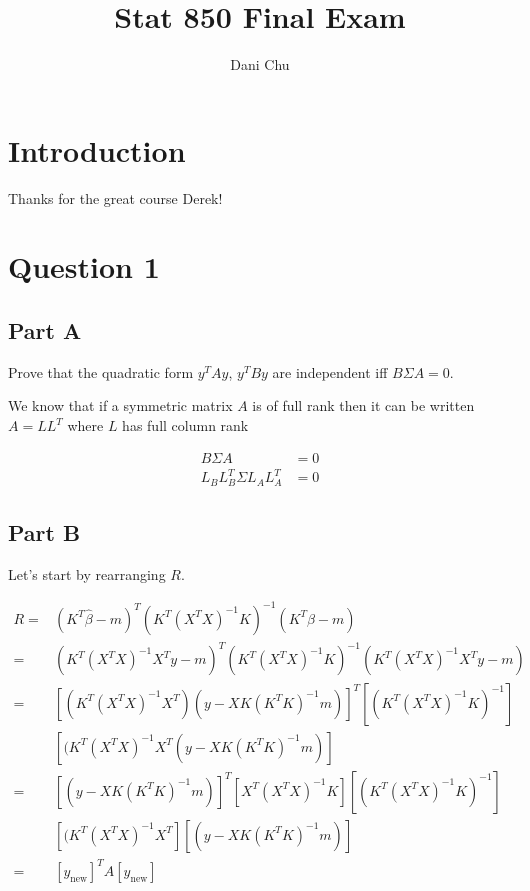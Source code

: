 \documentclass[]{book}
\title{Stat 850 Final Exam}
\author{Dani Chu}
\date{}
\begin{document}
\maketitle

{
\setcounter{tocdepth}{1}
\tableofcontents
}
\hypertarget{introduction}{%
\chapter{Introduction}\label{introduction}}

Thanks for the great course Derek!

\hypertarget{question-1}{%
\chapter{Question 1}\label{question-1}}

\hypertarget{part-a}{%
\section{Part A}\label{part-a}}

Prove that the quadratic form \(y^{T} A y\), \(y^{T} B y\) are independent iff \(B \Sigma A = 0\).

We know that if a symmetric matrix \(A\) is of full rank then it can be written \(A = LL^T\) where \(L\) has full column rank

\begin{align}
  B \Sigma A &= 0 \\
  L_{B}L_{B}^T \Sigma L_{A}L_{A}^T & = 0
\end{align}

\hypertarget{part-b}{%
\section{Part B}\label{part-b}}

Let's start by rearranging \(R\).

\begin{align}
  R =& (K^T \hat{\beta} -m )^T (K^T (X^T X)^{-1} K)^{-1} (K^T \hat{\beta} - m) \\
    =& (K^T (X^T X)^{-1} X^T y - m )^T (K^T (X^T X)^{-1} K)^{-1} (K^T (X^T X)^{-1} X^T y - m) \\
    =& [ (K^T (X^T X)^{-1} X^T ) ( y - X K (K^T K)^{-1} m ) ]^T [ (K^T (X^T X)^{-1} K)^{-1} ] \\
    & [ (K^T (X^T X)^{-1} X^T ( y - X K (K^T K)^{-1} m ) ] \\
    =& [ ( y - X K (K^T K)^{-1} m ) ]^T [ X^T (X^T X)^{-1} K ] [ (K^T (X^T X)^{-1} K)^{-1} ] \\
    & [ (K^T (X^T X)^{-1} X^T] [( y - X K (K^T K)^{-1} m ) ] \\
    =& [y_{\text{new}}]^T A [y_{\text{new}}]
\end{align}
\end{document}
